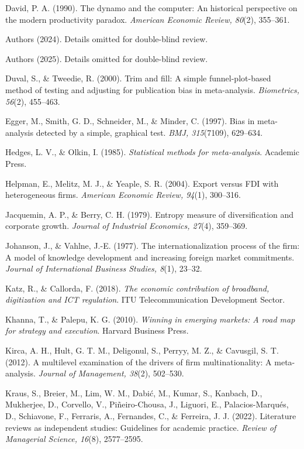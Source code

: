 \documentclass[
  12pt,a4paper]{article}
\begin{document}
David, P. A. (1990). The dynamo and the computer: An historical
perspective on the modern productivity paradox. \emph{American Economic
Review, 80}(2), 355--361.

Authors (2024). Details omitted for double-blind review.

Authors (2025). Details omitted for double-blind review.

Duval, S., \& Tweedie, R. (2000). Trim and fill: A simple
funnel-plot-based method of testing and adjusting for publication bias
in meta-analysis. \emph{Biometrics, 56}(2), 455--463.

Egger, M., Smith, G. D., Schneider, M., \& Minder, C. (1997). Bias in
meta-analysis detected by a simple, graphical test. \emph{BMJ,
315}(7109), 629--634.

Hedges, L. V., \& Olkin, I. (1985). \emph{Statistical methods for
meta-analysis}. Academic Press.

Helpman, E., Melitz, M. J., \& Yeaple, S. R. (2004). Export versus FDI
with heterogeneous firms. \emph{American Economic Review, 94}(1),
300--316.

Jacquemin, A. P., \& Berry, C. H. (1979). Entropy measure of
diversification and corporate growth. \emph{Journal of Industrial
Economics, 27}(4), 359--369.

Johanson, J., \& Vahlne, J.-E. (1977). The internationalization process
of the firm: A model of knowledge development and increasing foreign
market commitments. \emph{Journal of International Business Studies,
8}(1), 23--32.

Katz, R., \& Callorda, F. (2018). \emph{The economic contribution of
broadband, digitization and ICT regulation}. ITU Telecommunication
Development Sector.

Khanna, T., \& Palepu, K. G. (2010). \emph{Winning in emerging markets:
A road map for strategy and execution}. Harvard Business Press.

Kirca, A. H., Hult, G. T. M., Deligonul, S., Perryy, M. Z., \& Cavusgil,
S. T. (2012). A multilevel examination of the drivers of firm
multinationality: A meta-analysis. \emph{Journal of Management, 38}(2),
502--530.

Kraus, S., Breier, M., Lim, W. M., Dabić, M., Kumar, S., Kanbach, D.,
Mukherjee, D., Corvello, V., Piñeiro-Chousa, J., Liguori, E.,
Palacios-Marqués, D., Schiavone, F., Ferraris, A., Fernandes, C., \&
Ferreira, J. J. (2022). Literature reviews as independent studies:
Guidelines for academic practice. \emph{Review of Managerial Science,
16}(8), 2577--2595.
\end{document}
